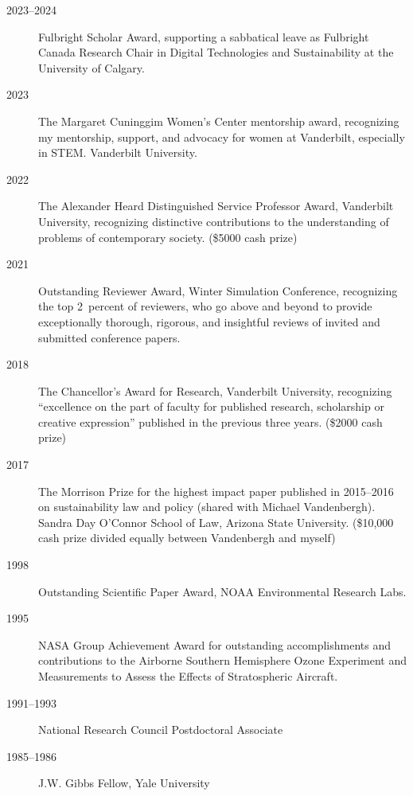 \begin{description}
\item[2023--2024] Fulbright Scholar Award, supporting a sabbatical leave as
  Fulbright Canada Research Chair in Digital Technologies and Sustainability
  at the University of Calgary.
\item[2023] The Margaret Cuninggim Women's Center mentorship award, recognizing
  my mentorship, support, and advocacy for women at Vanderbilt, especially in
  STEM. Vanderbilt University.
\item[2022] The Alexander Heard Distinguished Service Professor Award,
  Vanderbilt University, recognizing distinctive contributions to the
  understanding of problems of contemporary society.
  (\$5000 cash prize)
\item[2021] Outstanding Reviewer Award, Winter Simulation Conference,
  recognizing the top 2~percent of reviewers, who go above and beyond to provide
  exceptionally thorough, rigorous, and insightful reviews of invited and
  submitted conference papers.
\item[2018] The Chancellor's Award for Research, Vanderbilt University,
  recognizing ``excellence on the part of faculty for
  published research, scholarship or creative expression'' published in the
  previous three years.
  (\$2000 cash prize)
\item[2017] The Morrison Prize for the highest impact paper published in
  2015--2016 on sustainability law and policy (shared with Michael Vandenbergh).
  Sandra Day O'Connor School of Law, Arizona State University.
  (\$10,000 cash prize divided equally between Vandenbergh and myself)
\item[1998] Outstanding Scientific Paper Award, NOAA Environmental Research
  Labs.
\item[1995] NASA Group Achievement Award for outstanding accomplishments and
  contributions to the Airborne Southern Hemisphere Ozone Experiment and
  Measurements to Assess the Effects of Stratospheric Aircraft.
\item[1991--1993] National Research Council Postdoctoral Associate
\item[1985--1986] J.W. Gibbs Fellow, Yale University
\end{description}
